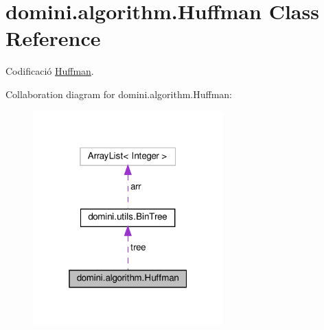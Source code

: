 \hypertarget{classdomini_1_1algorithm_1_1Huffman}{}\section{domini.\+algorithm.\+Huffman Class Reference}
\label{classdomini_1_1algorithm_1_1Huffman}


Codificació \hyperlink{classdomini_1_1algorithm_1_1Huffman}{Huffman}.  




Collaboration diagram for domini.\+algorithm.\+Huffman\+:
\nopagebreak
\begin{figure}[H]
\begin{center}
\leavevmode
\includegraphics[width=208pt]{classdomini_1_1algorithm_1_1Huffman__coll__graph}
\end{center}
\end{figure}
